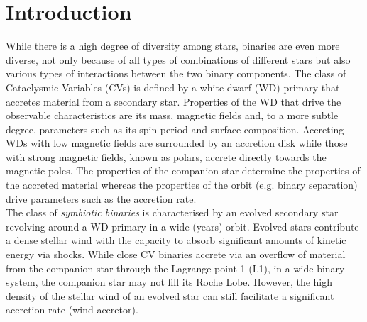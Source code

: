 \documentclass{aa}
\newcommand{\swift}{{\it Swift}}
\newcommand{\xmm}{{\it XMM-Newton}}
\newcommand{\asat}{{\it AstroSat}}
\newcommand{\nicer}{{\it NICER}}
\begin{document}
\section{Introduction}

\begin{figure*}[!ht]
\caption{\label{fig:mmlc}Multi-mission X-ray/UV light curves during the SSS
phase. UV data with UVM2 filter ($2120\pm500$\,\AA) were taken with
\swift/UVOT (ObsID ranges 00045788033-00045788053 and
00011558001-00011558021) and \xmm/OM (UV) and X-ray data over the energy range $\sim
0.3-10$\,keV with \asat/SXT (ObsIDs 9000003142 and 9000003160), \swift/XRT, \nicer\
(ObsIDs 2200810104 on day 18.3 and 2200810106 on day 21.3), and the MOS2 light
curve extracted from our new \xmm\ observation (see legend). The
\xmm\ MOS2 and OM/UVM2 light curves were taken between two \swift\
observations but overlap with 5 \asat/SXT observations. The high time
resolution of the \xmm\ observation demonstrates the high degree of
variability in X-rays on time scales shorter than the Earth occultation
gaps between \swift\ and \asat\ observations. Meanwhile, in UV, a slow
declining trend can be seen that is consistent in the \swift/UVOT and
\xmm/OM data. See \S\ref{sect:obs} for discussion.}
\end{figure*}

While there is a high degree of diversity among stars, binaries are
even more diverse, not only because of all types of combinations of
different stars but also various types of interactions between the
two binary components.
The class of Cataclysmic Variables (CVs) is defined by a white dwarf
(WD) primary that accretes material from a secondary star.
Properties of the WD that drive the observable characteristics are 
its mass, magnetic fields and, to a more subtle degree, parameters such
as its spin period and surface composition. Accreting WDs with low magnetic
fields are surrounded by an accretion disk while those with strong
magnetic fields, known as polars, accrete directly towards the magnetic
poles. The properties of the companion star determine the properties
of the accreted material whereas the properties of the orbit (e.g.
binary separation) drive parameters such as the accretion rate.\\

The class of {\em symbiotic binaries} is characterised by an evolved
secondary star revolving around a WD primary in a wide (years)
orbit. Evolved stars contribute a dense stellar wind with the
capacity to absorb significant amounts of kinetic energy via shocks.
While close CV binaries accrete via an overflow of material from the
companion star through the Lagrange point 1 (L1), in a wide
binary system, the companion star may not fill its Roche Lobe. However,
the high density of the stellar wind of an evolved star can still
facilitate a significant accretion rate (wind accretor).\\
\end{document}

